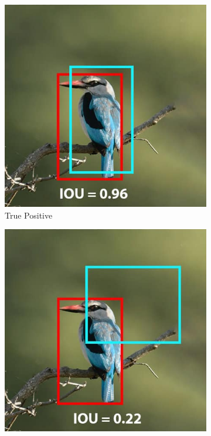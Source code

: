 \begin{figure}[H]
    \centering
    \begin{subfigure}{0.32\textwidth}
        \centering
        \includegraphics[width=\textwidth]{Images/iou_left.png}
        \caption{\centering True Positive}
    \end{subfigure}
    \hfill
    \begin{subfigure}{0.32\textwidth}
        \centering
        \includegraphics[width=\textwidth]{Images/iou_middle.png}

\end{subfigure}
\end{figure}
